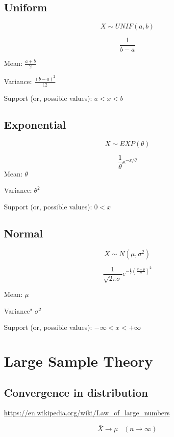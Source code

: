 \documentclass[]{book}
\begin{document}
\hypertarget{uniform}{%
\subsection{Uniform}\label{uniform}}

\[X \sim UNIF(a,b)\]

\[\frac{1}{b-a}\]

Mean: \(\frac{a+b}{2}\)

Variance: \(\frac{(b-a)^2}{12}\)

Support (or, possible values): \(a<x<b\)

\hypertarget{exponential}{%
\subsection{Exponential}\label{exponential}}

\[X \sim EXP(\theta)\]

\[\frac{1}{\theta} e^{-x/\theta}\]
Mean: \(\theta\)

Variance: \(\theta^2\)

Support (or, possible values): \(0<x\)

\hypertarget{normal}{%
\subsection{Normal}\label{normal}}

\[X\sim N(\mu, \sigma^2)\]

\[\frac{1}{\sqrt{2 \pi \sigma}} e^{-\frac{1}{2}(\frac{x-\mu}{\sigma})^2}\]

Mean: \(\mu\)

Variance" \(\sigma^2\)

Support (or, possible values): \(-\infty<x<+\infty\)

\hypertarget{large-sample-theory}{%
\section{Large Sample Theory}\label{large-sample-theory}}

\hypertarget{convergence-in-distribution}{%
\subsection{Convergence in distribution}\label{convergence-in-distribution}}

\url{https://en.wikipedia.org/wiki/Law_of_large_numbers}

\[\bar{X} \rightarrow \mu \; \; \; (n \rightarrow \infty)\]
\end{document}
